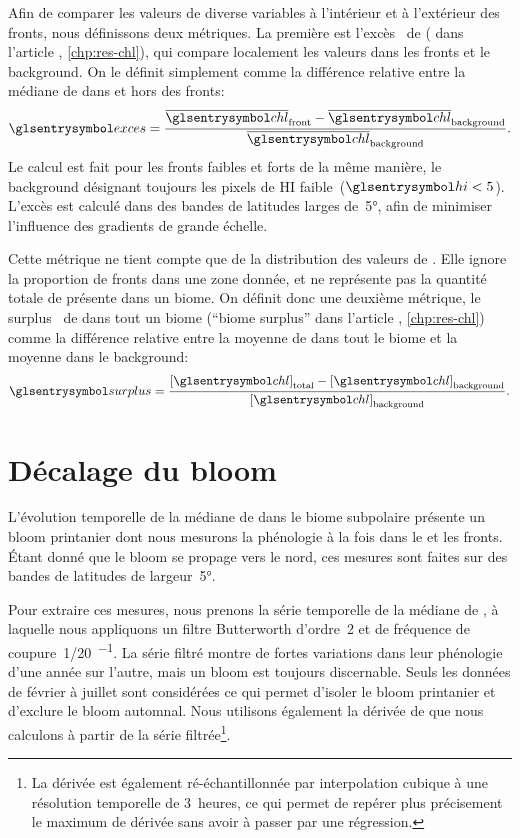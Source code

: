Afin de comparer les valeurs de diverse variables à l'intérieur et à l'extérieur des fronts, nous définissons deux métriques.
La première est l'excès~ de  ( dans l'article , \cref*{chp:res-chl}), qui compare localement les valeurs dans les fronts et le background. On le définit simplement comme la différence relative entre la médiane de  dans et hors des fronts:
\begin{equation}
  \am{exces} = \frac{\med{\am{chl}}_\frt - \med{\am{chl}}_\bkg}
  {\med{\am{chl}}_\bkg} .
\end{equation}
Le calcul est fait pour les fronts faibles et forts de la même manière, le background désignant toujours les pixels de HI faible~(\(\am{hi} < 5\)).
L'excès est calculé dans des bandes de latitudes larges de~\ang[mode=math]{5}, afin de minimiser l'influence des gradients de grande échelle.

Cette métrique ne tient compte que de la distribution des valeurs de . Elle ignore la proportion de fronts dans une zone donnée, et ne représente pas la quantité totale de  présente dans un biome.
On définit donc une deuxième métrique, le surplus~ de  dans tout un biome (\enquote{biome surplus} dans l'article , \cref*{chp:res-chl}) comme la différence relative entre la moyenne de  dans tout le biome et la moyenne dans le background:
\begin{equation}
  \am{surplus} = \frac{\moy{\am{chl}}_\tot - \moy{\am{chl}}_\bkg}
  {\moy{\am{chl}}_\bkg} .
\end{equation}

\section{Décalage du bloom}
\label{sec:decalage-bloom}

L'évolution temporelle de la médiane de  dans le biome subpolaire présente un bloom printanier dont nous mesurons la phénologie  à la fois dans le  et les fronts.
Étant donné que le bloom se propage vers le nord, ces mesures sont faites sur des bandes de latitudes de largeur~\ang[mode=math]{5}.

Pour extraire ces mesures, nous prenons la série temporelle de la médiane de , à laquelle nous appliquons un filtre Butterworth d'ordre~2 et de fréquence de coupure~\qty[parse-numbers=false]{1/20}{\jours^{-1}}.
La série filtré montre de fortes variations dans leur phénologie d'une année sur l'autre, mais un bloom est toujours discernable.
Seuls les données de février à juillet sont considérées ce qui permet d'isoler le bloom printanier et d'exclure le bloom automnal.
Nous utilisons également la dérivée de  que nous calculons à partir de la série filtrée\footnote{%
  La dérivée est également ré-échantillonnée par interpolation cubique à une résolution temporelle de 3~heures, ce qui permet de repérer plus précisement le maximum de dérivée sans avoir à passer par une régression.
}.


